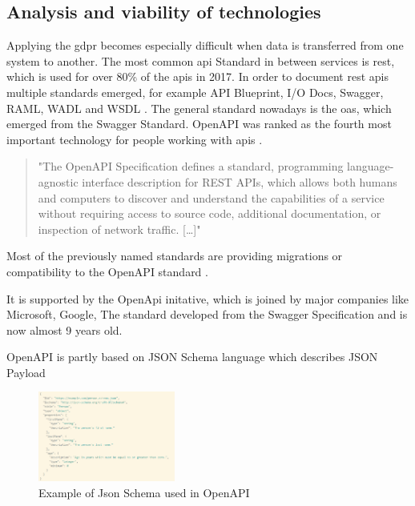\subsection{Analysis and viability of technologies}

Applying the \ac{gdpr} becomes especially difficult when data is transferred from one system to another. The most common \ac{api} Standard in between services is \ac{rest}, which is used for over 80\% \cite{CloudElements2017TheIntegration} of the \glspl{api} in 2017. In order to document \ac{rest} \glspl{api} multiple standards emerged, for example API Blueprint, I/O Docs, Swagger, RAML, WADL and WSDL \cite{Scherer2016DescriptionTransformation}. The general standard nowadays is the \ac{oas}, which emerged from the Swagger Standard. OpenAPI was ranked as the fourth most important technology for people working with \glspl{api} \cite{2019Technologies2019}. 

\begin{quote}
"The OpenAPI Specification defines a standard, programming language-agnostic interface description for REST APIs, which allows both humans and computers to discover and understand the capabilities of a service without requiring access to source code, additional documentation, or inspection of network traffic. [\dots]"
\cite{OpenAPISpecification}
\end{quote}

Most of the previously named standards are providing migrations or compatibility to the OpenAPI standard \cite{Scherer2016DescriptionTransformation}.


It is supported by the OpenApi initative, which is joined by major companies like Microsoft, Google, \cite{TheLinuxFoundation2020CurrentInitiative}
The standard developed from the Swagger Specification and is now almost 9 years old. 

OpenAPI is partly based on JSON Schema language which describes JSON Payload 



\begin{figure}[htbp]
\centerline{\includegraphics[width=0.4\textwidth]{figures/json_schema_example.png}}
\caption{Example of Json Schema used in OpenAPI \cite{MiscellaneousSchema}}
\label{json_schema_example}
\end{figure}

